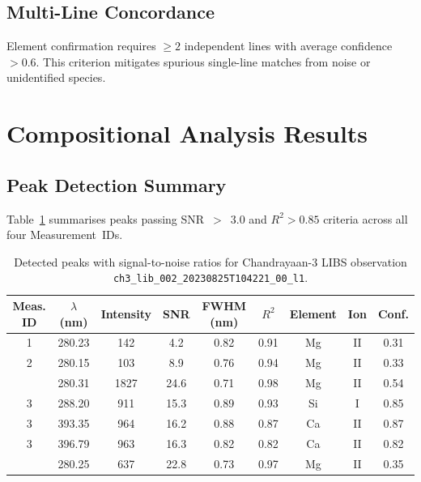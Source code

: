 \documentclass[a4paper,twocolumn,10pt]{article}
\begin{document}
\subsection{Multi-Line Concordance}

Element confirmation requires $\geq 2$ independent lines with average
confidence $> 0.6$. This criterion mitigates spurious single-line
matches from noise or unidentified species.

\section{Compositional Analysis Results}
\label{sec:results}

\subsection{Peak Detection Summary}

Table~\ref{tab:detected_peaks} summarises peaks passing SNR~$>$~3.0 and
$R^2 > 0.85$ criteria across all four Measurement~IDs.

\begin{table}[!t]
\centering
\caption{Detected peaks with signal-to-noise ratios for Chandrayaan-3
  LIBS observation \texttt{ch3\_lib\_002\_20230825T104221\_00\_l1}.}
\label{tab:detected_peaks}
{\small
\begin{tabularx}{\textwidth}{@{}ccccccccc@{}}
\toprule
\textbf{Meas. ID} & \textbf{$\lambda$ (nm)} & \textbf{Intensity} &
  \textbf{SNR} & \textbf{FWHM (nm)} & \textbf{$R^2$} &
  \textbf{Element} & \textbf{Ion} & \textbf{Conf.} \\
\midrule
1 & 280.23 & 142 & 4.2 & 0.82 & 0.91 & Mg & II & 0.31 \\
2 & 280.15 & 103 & 8.9 & 0.76 & 0.94 & Mg & II & 0.33 \\
\addlinespace
3 & 280.31 & 1827 & 24.6 & 0.71 & 0.98 & Mg & II & 0.54 \\
3 & 288.20 & 911 & 15.3 & 0.89 & 0.93 & Si & I  & 0.85 \\
3 & 393.35 & 964 & 16.2 & 0.88 & 0.87 & Ca & II & 0.87 \\
3 & 396.79 & 963 & 16.3 & 0.82 & 0.82 & Ca & II & 0.82 \\
\addlinespace
4 & 280.25 & 637 & 22.8 & 0.73 & 0.97 & Mg & II & 0.35 \\
\bottomrule
\end{tabularx}
}
\end{table}
\end{document}

